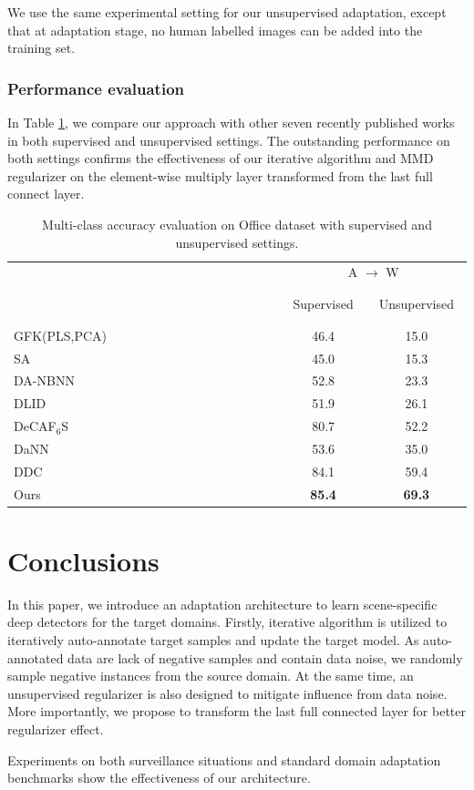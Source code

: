 \documentclass[runningheads]{llncs}
\begin{document}
We use the same experimental setting for our unsupervised adaptation, except that at adaptation stage, no human labelled images can be added into the training set.
\subsubsection{Performance evaluation}
In Table \ref{table:office}, we compare our approach with other seven recently published works in both supervised and unsupervised settings. The outstanding performance on both settings confirms the effectiveness of our iterative algorithm and MMD regularizer on the element-wise multiply layer transformed from the last full connect layer.


\begin{table}
\centering
\caption{Multi-class accuracy evaluation on Office dataset with supervised and unsupervised settings.} \label{table:office}
\begin{tabular}{l c c}
  \hline
   & \multicolumn{2}{c}{A $\rightarrow$ W}    \\
   \cline{2-3}
   ~~~~~~~~~~~~~~~~~~~~~~~~~~~~~~~
   ~~~~~~~~~~~~~~~~~~~~~~~~~~~~~~~
    & ~Supervised~ & ~Unsupervised~ \\
  \hline
  GFK(PLS,PCA)\cite{gong2012geodesic} & 46.4 & 15.0 \\
  SA \cite{fernando2013unsupervised} & 45.0 & 15.3 \\
  DA-NBNN \cite{tommasi2013frustratingly} & 52.8 & 23.3 \\
  DLID \cite{chopra2013dlid}& 51.9 & 26.1 \\
  DeCAF${}_{6}$S \cite{donahue2013decaf} & 80.7 & 52.2 \\
  DaNN \cite{ghifary2014domain}& 53.6 & 35.0 \\
  DDC\cite{tzeng2014deep} & 84.1 & 59.4 \\
  \hline
  Ours & {\bf 85.4} & {\bf 69.3} \\
  \hline
\end{tabular}
\end{table}


\section{Conclusions}
\label{section:Conclusions}

In this paper, we introduce an adaptation architecture to learn scene-specific deep detectors for the target domains. Firstly, iterative algorithm is utilized to iteratively auto-annotate target samples and update the target model. As auto-annotated data are lack of negative samples and contain data noise, we randomly sample negative instances from the source domain. At the same time, an unsupervised regularizer is also designed to mitigate influence from data noise. More importantly, we propose to transform the last full connected layer for better regularizer effect.

Experiments on both surveillance situations and standard domain adaptation benchmarks show the effectiveness of our architecture.




\end{document}
